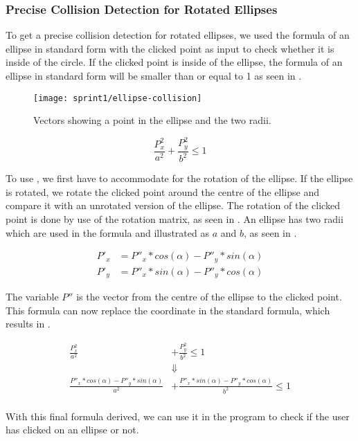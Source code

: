 \subsubsection{Precise Collision Detection for Rotated Ellipses}
To get a precise collision detection for rotated ellipses, we used the formula of an ellipse in standard form with the clicked point as input to check whether it is inside of the circle.
If the clicked point is inside of the ellipse, the formula of an ellipse in standard form will be smaller than or equal to 1 as seen in .

\begin{figure}[h]
	\centering
	\texttt{[image: sprint1/ellipse-collision]}
	\caption{Vectors showing a point in the ellipse and the two radii.}
	\label{figure:ellipse-collision}
\end{figure}

\begin{equation}\label{eq:standard-equation}
	\frac{P_x^2}{a^2} + \frac{P_y^2}{b^2} \leq 1
\end{equation}

To use , we first have to accommodate for the rotation of the ellipse.
If the ellipse is rotated, we rotate the clicked point around the centre of the ellipse and compare it with an unrotated version of the ellipse.
The rotation of the clicked point is done by use of the rotation matrix, as seen in .
An ellipse has two radii which are used in the formula and illustrated as $a$ and $b$, as seen in .

\begin{equation}\label{eq:ellipses-rotation-matrix}
\begin{aligned}
	P'_x &= P''_x * cos(\alpha) - P''_y * sin(\alpha)\\
	P'_y &= P''_x * sin(\alpha) - P''_y * cos(\alpha)
\end{aligned}
\end{equation}

The variable $P''$ is the vector from the centre of the ellipse to the clicked point.
This formula can now replace the coordinate in the standard formula, which results in .

\begin{equation}\label{eq:final-ellipses-equation}
\begin{aligned}
	\frac{P_x^2}{a^2} &+ \frac{P_y^2}{b^2} \leq 1	\\
	&\Downarrow\\
	\frac{ P''_x * cos(\alpha) - P''_y * sin(\alpha)}{a^2} &+ \frac{P''_x * sin(\alpha) - P''_y * cos(\alpha)}{b^2} \leq 1\\
\end{aligned}
\end{equation}

With this final formula derived, we can use it in the program to check if the user has clicked on an ellipse or not.